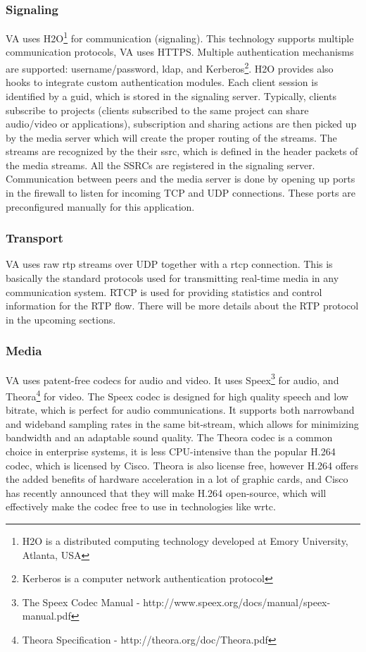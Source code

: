 \subsubsection{Signaling}
VA uses H2O\footnote{H2O is a distributed computing technology developed at Emory University, Atlanta, USA} for communication (signaling). This technology supports multiple communication protocols, VA uses HTTPS. Multiple authentication mechanisms are supported: username/password, \gls{ldap}, and Kerberos\footnote{Kerberos is a computer network authentication protocol}. H2O provides also hooks to integrate custom authentication modules. Each client session is identified by a \gls{guid}, which is stored in the signaling server. Typically, clients subscribe to projects (clients subscribed to the same project can share audio/video or applications), subscription and sharing actions are then picked up by the media server which will create the proper routing of the streams. The streams are recognized by the their \gls{ssrc}, which is defined in the header packets of the media streams. All the SSRCs are registered in the signaling server. Communication between peers and the media server is done by opening up ports in the firewall to listen for incoming TCP and UDP connections. These ports are preconfigured manually for this application.

\subsubsection{Transport}
VA uses raw \gls{rtp} streams over UDP together with a \gls{rtcp} connection. This is basically the standard protocols used for transmitting real-time media in any communication system. RTCP is used for providing statistics and control information for the RTP flow. There will be more details about the RTP protocol in the upcoming sections.

\subsubsection{Media}
VA uses patent-free codecs for audio and video. It uses Speex\footnote{The Speex Codec Manual - http://www.speex.org/docs/manual/speex-manual.pdf} for audio, and Theora\footnote{Theora Specification - http://theora.org/doc/Theora.pdf} for video. The Speex codec is designed for high quality speech and low bitrate, which is perfect for audio communications. It supports both narrowband and wideband sampling rates in the same bit-stream\cite{speex}, which allows for minimizing bandwidth and an adaptable sound quality. The Theora codec is a common choice in enterprise systems, it is less CPU-intensive than the popular H.264 codec\cite{theora}, which is licensed by Cisco. Theora is also license free, however H.264 offers the added benefits of hardware acceleration in a lot of graphic cards, and Cisco has recently announced that they will make H.264 open-source\cite{h264-free}, which will effectively make the codec free to use in technologies like \gls{wrtc}.

